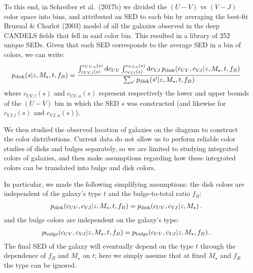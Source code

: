 \documentclass[11pt,a4paper]{article}
\newcommand{\mstar}{M_\star}
\newcommand{\uvj}{\text{\it UVJ}\xspace}
\newcommand{\dd}{\mathrm{d}}
\numberwithin{equation}{section}
\begin{document}
To this end, in Schreiber et al.~(2017b) we divided the $(U-V)$ vs $(V-J)$ color space into bins, and attributed an SED to each bin by averaging the best-fit Bruzual \& Charlot (2003) model of all the galaxies observed in the deep CANDELS fields that fell in said color bin. This resulted in a library of 252 unique SEDs. Given that each SED corresponds to the average SED in a bin of \uvj colors, we can write:
\begin{align}
p_{\rm disk}(s | z, \mstar, t, f_B) = \frac{\int_{c_{UV,l}(s)}^{c_{UV,u}(s)} \dd c_{UV} \int_{c_{V\!J,l}(s)}^{c_{V\!J,u}(s)} \dd c_{V\!J}\,p_{\rm disk}(c_{UV}, c_{V\!J} | z, \mstar, t, f_B)}{\sum_{s'} p_{\rm disk}(s' | z, \mstar, t, f_B)}
\end{align}
where $c_{UV,l}(s)$ and $c_{UV,u}(s)$ represent respectively the lower and upper bounds of the $(U-V)$ bin in which the SED $s$ was constructed (and likewise for $c_{V\!J,l}(s)$ and $c_{V\!J,u}(s)$).

We then studied the observed location of galaxies on the \uvj diagram to construct the color distributions. Current data do not allow us to perform reliable color studies of disks and bulges separately, so we are limited to studying integrated colors of galaxies, and then make assumptions regarding how these integrated colors can be translated into bulge and disk colors.

In particular, we made the following simplifying assumptions: the disk colors are independent of the galaxy's type $t$ and the bulge-to-total ratio $f_B$:
\begin{align}
p_{\rm disk}(c_{UV}, c_{V\!J} | z, \mstar, t, f_B) = p_{\rm disk}(c_{UV}, c_{V\!J} | z, \mstar)\,.
\end{align}
and the bulge colors are independent on the galaxy's type:
\begin{align}
p_{\rm bulge}(c_{UV}, c_{V\!J} | z, \mstar, t, f_B) = p_{\rm bulge}(c_{UV}, c_{V\!J} | z, \mstar, f_B)\,.
\end{align}
The final SED of the galaxy will eventually depend on the type $t$ through the dependence of $f_B$ and $\mstar$ on $t$; here we simply assume that at fixed $\mstar$ and $f_B$ the type can be ignored.
\end{document}
